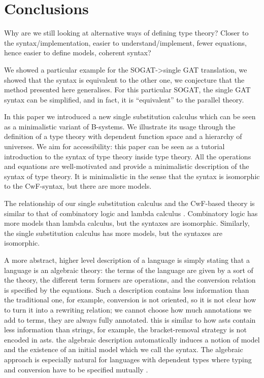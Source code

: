 \documentclass[sigplan,10pt,anonymous,review]{acmart}\settopmatter{printfolios=true,printccs=false,printacmref=false}
\begin{document}
\section{Conclusions}
\label{sec:conclusion}

Why are we still looking at alternative ways of defining type theory?
Closer to the syntax/implementation, easier to understand/implement,
fewer equations, hence easier to define models, coherent syntax?

We showed a particular example for the SOGAT->single GAT translation,
we showed that the syntax is equivalent to the other one, we
conjecture that the method presented here generalises. For this
particular SOGAT, the single GAT syntax can be simplified, and in
fact, it is ``equivalent'' to the parallel theory.

In this paper we introduced a new single substitution calculus which
can be seen as a minimalistic variant of B-systems. We illustrate its
usage through the definition of a type theory with dependent function
space and a hierarchy of universes. We aim for accessibility: this
paper can be seen as a tutorial introduction to the syntax of type
theory inside type theory. All the operations and equations are
well-motivated and provide a minimalistic description of the syntax of
type theory. It is minimalistic in the sense that the syntax is
isomorphic to the CwF-syntax, but there are more models. 

The relationship of our single substitution calculus and the CwF-based
theory is similar to that of combinatory logic and lambda calculus
\cite{DBLP:conf/fscd/AltenkirchKSV23}. Combinatory logic has more
models than lambda calculus, but the syntaxes are
isomorphic. Similarly, the single substitution calculus has more
models, but the syntaxes are isomorphic.

A more abstract, higher level description of a language is simply
stating that a language is an algebraic theory: the terms of the
language are given by a sort of the theory, the different term formers
are operations, and the conversion relation is specified by the
equations. Such a description contains less information than the
traditional one, for example, conversion is not oriented, so it is not
clear how to turn it into a rewriting relation; we cannot choose how
much annotations we add to terms, they are always fully
annotated. this is similar to how asts contain less information than
strings, for example, the bracket-removal strategy is not encoded in
asts. the algebraic description automatically induces a notion of
model and the existence of an initial model
\cite{DBLP:journals/pacmpl/KaposiKA19} which we call the syntax. The
algebraic approach is especially natural for languages with dependent
types where typing and conversion have to be specified mutually
\cite{DBLP:conf/popl/AltenkirchK16}.
\end{document}
